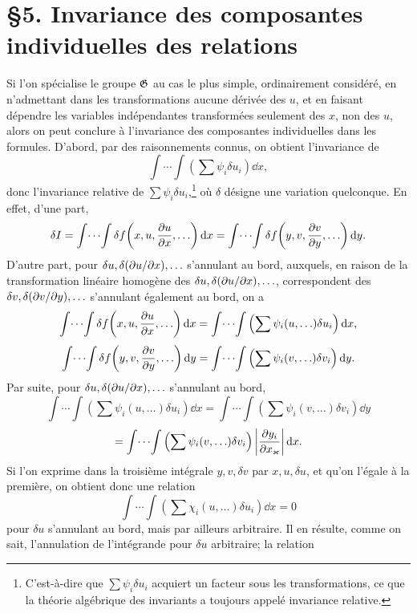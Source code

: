 \section*{\S{}5. Invariance des composantes individuelles des relations}

Si l'on spécialise le groupe \(\mathfrak G\) au cas le plus simple, ordinairement considéré, en n'admettant dans les transformations aucune dérivée des \(u\), et en faisant dépendre les variables indépendantes transformées seulement des \(x\), non des \(u\), alors on peut conclure à l'invariance des composantes individuelles dans les formules. D'abord, par des raisonnements connus, on obtient l'invariance de
\[
\int\!\cdots\!\int\left(\sum\psi_i\delta u_i\right)\dd x,
\]
donc l'invariance relative de \(\sum\psi_i\delta u_i\),\footnote{C'est-à-dire que \(\sum\psi_i\delta u_i\) acquiert un facteur sous les transformations, ce que la théorie algébrique des invariants a toujours appelé invariance relative.} où \(\delta\) désigne une variation quelconque. En effet, d'une part,
\[
\delta I
=\int\!\cdots\!\int \delta f\!\left(x,u,\frac{\partial u}{\partial x},\ldots\right)\mathrm d x
=\int\!\cdots\!\int \delta f\!\left(y,v,\frac{\partial v}{\partial y},\ldots\right)\mathrm d y.
\]
D'autre part, pour \(\delta u,\delta(\partial u/\partial x),\ldots\) s'annulant au bord, auxquels, en raison de la transformation linéaire homogène des \(\delta u,\delta(\partial u/\partial x),\ldots\), correspondent des \(\delta v,\delta(\partial v/\partial y),\ldots\) s'annulant également au bord, on a
\[
\int\!\cdots\!\int \delta f\!\left(x,u,\frac{\partial u}{\partial x},\ldots\right)\mathrm d x
=
\int\!\cdots\!\int\left(\sum\psi_i(u,\ldots)\delta u_i\right)\mathrm d x,
\]
\[
\int\!\cdots\!\int \delta f\!\left(y,v,\frac{\partial v}{\partial y},\ldots\right)\mathrm d y
=
\int\!\cdots\!\int\left(\sum\psi_i(v,\ldots)\delta v_i\right)\mathrm d y.
\]
Par suite, pour \(\delta u,\delta(\partial u/\partial x),\ldots\) s'annulant au bord,
\[
\int\!\cdots\!\int\left(\sum\psi_i(u,\ldots)\delta u_i\right)\dd x
=
\int\!\cdots\!\int\left(\sum\psi_i(v,\ldots)\delta v_i\right)\dd y
\]
\[
=
\int\!\cdots\!\int\left(\sum\psi_i(v,\ldots)\delta v_i\right)
\left|\frac{\partial y_i}{\partial x_\varkappa}\right|\mathrm d x.
\]
Si l'on exprime dans la troisième intégrale \(y,v,\delta v\) par \(x,u,\delta u\), et qu'on l'égale à la première, on obtient donc une relation
\[
\int\!\cdots\!\int\left(\sum\chi_i(u,\ldots)\delta u_i\right)\dd x=0
\]
pour \(\delta u\) s'annulant au bord, mais par ailleurs arbitraire. Il en résulte, comme on sait, l'annulation de l'intégrande pour \(\delta u\) arbitraire; la relation
